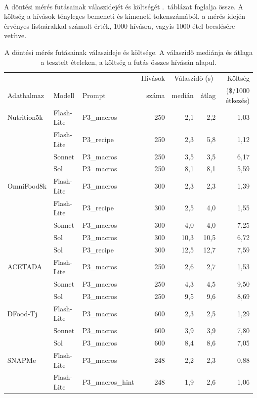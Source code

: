 \paragraph{}A döntési mérés futásainak válaszidejét és költségét 
\az{\ref{tab:koltseg_valaszido}}.~táblázat foglalja össze. A költség a hívások tényleges 
bemeneti és kimeneti tokenszámából, a mérés idején érvényes 
listaárakkal számolt érték, 1000 hívásra, vagyis 1000 étel becslésére vetítve.
\begin{table}[h]
\centering
\caption{A döntési mérés futásainak válaszideje és költsége. A válaszidő 
mediánja és átlaga a tesztelt ételeken, a költség a futás összes hívásán alapul.}
\label{tab:koltseg_valaszido}
\small
\begin{tabular}{lllrrrr}
\hline
 & & & Hívások & \multicolumn{2}{c}{Válaszidő (s)} & Költség \\
Adathalmaz & Modell & Prompt & száma & medián & átlag & (\$/1000 étkezés) \\
\hline
Nutrition5k & Flash-Lite & P3\_macros & 250 & 2{,}1 & 2{,}2 & 1{,}03 \\
 & Flash-Lite & P3\_recipe & 250 & 2{,}3 & 5{,}8 & 1{,}12 \\
 & Sonnet & P3\_macros & 250 & 3{,}5 & 3{,}5 & 6{,}17 \\
 & Sol & P3\_macros & 250 & 8{,}1 & 8{,}1 & 5{,}59 \\
\hline
OmniFood8k & Flash-Lite & P3\_macros & 300 & 2{,}3 & 2{,}3 & 1{,}39 \\
 & Flash-Lite & P3\_recipe & 300 & 2{,}5 & 4{,}0 & 1{,}55 \\
 & Sonnet & P3\_macros & 300 & 4{,}0 & 4{,}0 & 7{,}25 \\
 & Sol & P3\_macros & 300 & 10{,}3 & 10{,}5 & 6{,}72 \\
 & Sol & P3\_recipe & 300 & 12{,}5 & 12{,}7 & 7{,}59 \\
\hline
ACETADA & Flash-Lite & P3\_macros & 250 & 2{,}6 & 2{,}7 & 1{,}53 \\
 & Sonnet & P3\_macros & 250 & 4{,}3 & 4{,}5 & 9{,}50 \\
 & Sol & P3\_macros & 250 & 9{,}5 & 9{,}6 & 8{,}69 \\
\hline
DFood-Tj & Flash-Lite & P3\_macros & 600 & 2{,}3 & 2{,}5 & 1{,}29 \\
 & Sonnet & P3\_macros & 600 & 3{,}9 & 3{,}9 & 7{,}80 \\
 & Sol & P3\_macros & 600 & 8{,}4 & 8{,}6 & 7{,}05 \\
\hline
SNAPMe & Flash-Lite & P3\_macros & 248 & 2{,}2 & 2{,}3 & 0{,}88 \\
 & Flash-Lite & P3\_macros\_hint & 248 & 1{,}9 & 2{,}6 & 1{,}06 \\
\hline
\end{tabular}
\end{table}

